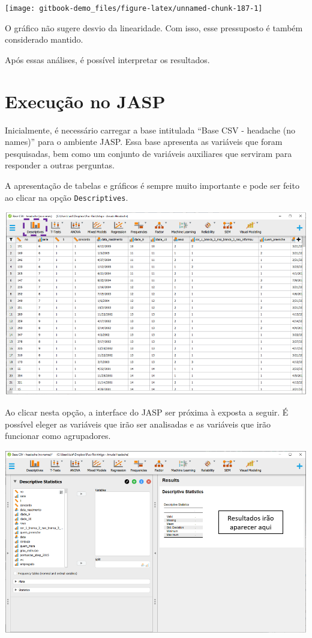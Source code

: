 \documentclass[
]{book}
\begin{document}
\begin{center}\texttt{[image: gitbook-demo\_files/figure-latex/unnamed-chunk-187-1]} \end{center}

O gráfico não sugere desvio da linearidade. Com isso, esse pressuposto é também considerado mantido.

Após essas análises, é possível interpretar os resultados.

\hypertarget{execuuxe7uxe3o-no-jasp-17}{%
\section{Execução no JASP}\label{execuuxe7uxe3o-no-jasp-17}}

Inicialmente, é necessário carregar a base intitulada ``Base CSV - headache (no names)'' para o ambiente JASP. Essa base apresenta as variáveis que foram pesquisadas, bem como um conjunto de variáveis auxiliares que serviram para responder a outras perguntas.

A apresentação de tabelas e gráficos é sempre muito importante e pode ser feito ao clicar na opção \texttt{Descriptives}.

\includegraphics{./img/cap_logistica_base.png}

Ao clicar nesta opção, a interface do JASP ser próxima à exposta a seguir. É possível eleger as variáveis que irão ser analisadas e as variáveis que irão funcionar como agrupadores.

\includegraphics{./img/cap_logistica_descriptives.png}
\end{document}
